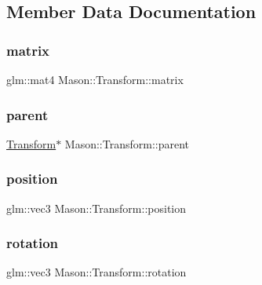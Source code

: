 \subsection{Member Data Documentation}
\hypertarget{class_mason_1_1_transform_aeb64a62787375e23645da6f490763c25}{}\label{class_mason_1_1_transform_aeb64a62787375e23645da6f490763c25} 
\subsubsection{\texorpdfstring{matrix}{matrix}}
{\footnotesize\ttfamily glm\+::mat4 Mason\+::\+Transform\+::matrix\hspace{0.3cm}{\ttfamily [protected]}}

\hypertarget{class_mason_1_1_transform_a1e2c91adcef43bcc170803656260f9db}{}\label{class_mason_1_1_transform_a1e2c91adcef43bcc170803656260f9db} 
\subsubsection{\texorpdfstring{parent}{parent}}
{\footnotesize\ttfamily \hyperlink{class_mason_1_1_transform}{Transform}$\ast$ Mason\+::\+Transform\+::parent\hspace{0.3cm}{\ttfamily [protected]}}

\hypertarget{class_mason_1_1_transform_ac9e11b4ec4433a38ac1100f12c955dcb}{}\label{class_mason_1_1_transform_ac9e11b4ec4433a38ac1100f12c955dcb} 
\subsubsection{\texorpdfstring{position}{position}}
{\footnotesize\ttfamily glm\+::vec3 Mason\+::\+Transform\+::position\hspace{0.3cm}{\ttfamily [protected]}}

\hypertarget{class_mason_1_1_transform_ae2f541ade79d561584619e93edb034ae}{}\label{class_mason_1_1_transform_ae2f541ade79d561584619e93edb034ae} 
\subsubsection{\texorpdfstring{rotation}{rotation}}
{\footnotesize\ttfamily glm\+::vec3 Mason\+::\+Transform\+::rotation\hspace{0.3cm}{\ttfamily [protected]}}

